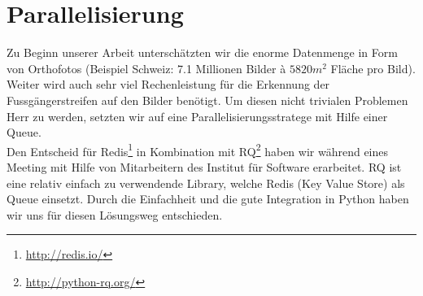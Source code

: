 \section{Parallelisierung}
Zu Beginn unserer Arbeit unterschätzten wir die enorme Datenmenge in Form von Orthofotos (Beispiel Schweiz: 7.1 Millionen Bilder à $5820 m^{2}$ Fläche pro Bild). Weiter wird auch sehr viel Rechenleistung für die Erkennung der Fussgängerstreifen auf den Bilder benötigt. Um diesen nicht trivialen Problemen Herr zu werden, setzten wir auf eine Parallelisierungsstratege mit Hilfe einer Queue. \\ 

Den Entscheid für Redis\footnote{\url{http://redis.io/}} in Kombination mit RQ\footnote{\url{http://python-rq.org/}} haben wir während eines Meeting mit Hilfe von Mitarbeitern des Institut für Software erarbeitet. RQ ist eine relativ einfach zu verwendende Library, welche Redis (Key Value Store) als Queue einsetzt. Durch die Einfachheit und die gute Integration in Python haben wir uns für diesen Lösungsweg entschieden.

\newpage
